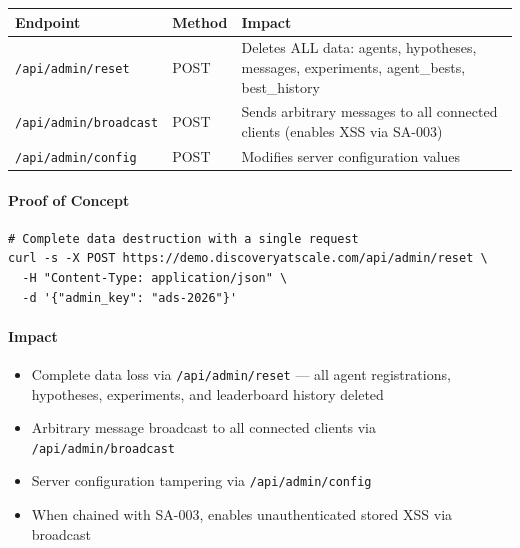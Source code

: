 \documentclass[twocolumn,10pt,letterpaper]{article}
\begin{document}
\vspace{0.4em}
\noindent
\small
\begin{tabularx}{\columnwidth}{@{}XXX@{}}
\toprule
\textbf{Endpoint} & \textbf{Method} & \textbf{Impact} \\
\midrule
\texttt{/\allowbreak api/\allowbreak admin/\allowbreak reset} & POST & Deletes ALL data: agents, hypotheses, messages, experiments, agent\_bests, best\_history \\
\texttt{/\allowbreak api/\allowbreak admin/\allowbreak broadcast} & POST & Sends arbitrary messages to all connected clients (enables XSS via SA-003) \\
\texttt{/\allowbreak api/\allowbreak admin/\allowbreak config} & POST & Modifies server configuration values \\
\bottomrule
\end{tabularx}
\vspace{0.4em}

\paragraph{Proof of Concept}

\begin{lstlisting}
# Complete data destruction with a single request
curl -s -X POST https://demo.discoveryatscale.com/api/admin/reset \
  -H "Content-Type: application/json" \
  -d '{"admin_key": "ads-2026"}'
\end{lstlisting}

\paragraph{Impact}

\begin{itemize}
\setlength{\itemsep}{0pt}
\setlength{\parskip}{0pt}
  \item Complete data loss via \texttt{/\allowbreak api/\allowbreak admin/\allowbreak reset} — all agent registrations, hypotheses, experiments, and leaderboard history deleted
  \item Arbitrary message broadcast to all connected clients via \texttt{/\allowbreak api/\allowbreak admin/\allowbreak broadcast}
  \item Server configuration tampering via \texttt{/\allowbreak api/\allowbreak admin/\allowbreak config}
  \item When chained with SA-003, enables unauthenticated stored XSS via broadcast
\end{itemize}
\end{document}
